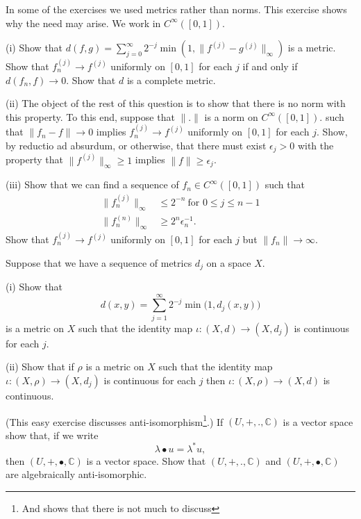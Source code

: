 \begin{exercise}\label{C5.13}
In some of the exercises we used metrics rather than norms.
This exercise
shows why the need may arise. 
We work in $C^{\infty}([0,1])$.

(i) Show that 
$d(f,g)=\sum_{j=0}^{\infty}2^{-j}\min(1,\|f^{(j)}-g^{(j)}\|_{\infty})$
is a metric. Show that $f_{n}^{(j)}\rightarrow f^{(j)}$
uniformly on $[0,1]$ for each $j$ if and only if  $d(f_{n},f)\rightarrow 0$.
Show that $d$ is a complete metric.

(ii) The object of the rest of this question is to show that there is no norm
with this property. To this end, suppose 
that $\|.\|$ is a norm on $C^{\infty}([0,1])$.
such that  $\|f_{n}-f\|\rightarrow 0$ implies $f_{n}^{(j)}\rightarrow f^{(j)}$
uniformly on $[0,1]$ for each $j$. Show, by reductio ad absurdum, or otherwise,
that there must exist $\epsilon_{j}>0$ with 
the property that $\|f^{(j)}\|_{\infty}\geq 1$
implies $\|f\|\geq\epsilon_{j}$.

(iii) Show that we can find a sequence of $f_{n}\in C^{\infty}([0,1])$
such that
\begin{align*}
\|f^{(j)}_{n}\|_{\infty}&\leq 2^{-n}\ \text{for $0\leq j\leq n-1$}\\
\|f^{(n)}_{n}\|_{\infty}&\geq 2^{n}\epsilon_{n}^{-1}.
\end{align*}
Show that  $f_{n}^{(j)}\rightarrow f^{(j)}$
uniformly on $[0,1]$ for each $j$ but $\|f_{n}\|\rightarrow \infty$.
\end{exercise}
\begin{exercise}\label{C5.14}
Suppose that we have a sequence of metrics $d_{j}$ on a space $X$.

(i) Show that
\[d(x,y)=\sum_{j=1}^{\infty}
2^{-j}\min\big(1,d_{j}(x,y)\big)\]
is a metric on $X$ such that
the identity map $\iota:(X,d)\rightarrow (X,d_{j})$ is continuous
for each $j$.

(ii) Show that if $\rho$ is a metric on $X$ such that
the identity map $\iota:(X,\rho)\rightarrow (X,d_{j})$ is continuous
for each $j$ then $\iota:(X,\rho)\rightarrow (X,d)$ 
is continuous.
\end{exercise}
\begin{exercise}\label{C5.15}\label{E;anti}
(This easy exercise discusses anti-isomorphism\footnote{And shows that
there is not much to discuss}.)
If $(U,+,.,{\mathbb C})$ is a vector space show that, if we write
\[\lambda\bullet u=\lambda^{*}u,\]
then $(U,+,\bullet,{\mathbb C})$ is a vector space. Show that
$(U,+,.,{\mathbb C})$ and $(U,+,\bullet,{\mathbb C})$
are algebraically anti-isomorphic.
\end{exercise}


